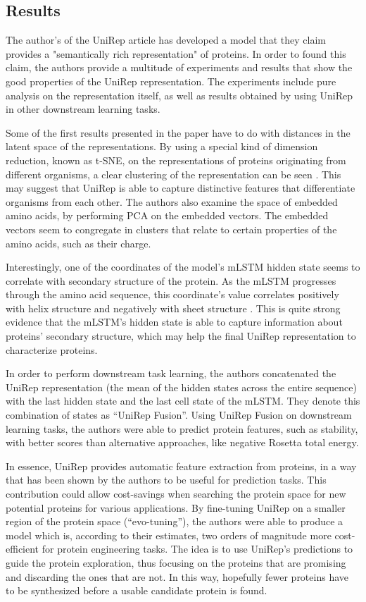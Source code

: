 \documentclass[a4paper,12pt]{article}
\begin{document}
\subsection{Results}

The author's of the UniRep article has developed a model that they claim provides a "semantically rich representation" of proteins. In order to found this claim, the authors provide a multitude of experiments and results that show the good properties of the UniRep representation. The experiments include pure analysis on the representation itself, as well as results obtained by using UniRep in other downstream learning tasks.

Some of the first results presented in the paper have to do with distances in the latent space of the representations. By using a special kind of dimension reduction, known as t-SNE, on the representations of proteins originating from different organisms, a clear clustering of the representation can be seen \cite[fig. 2b]{alley2019unified}. This may suggest that UniRep is able to capture distinctive features that differentiate organisms from each other. The authors also examine the space of embedded amino acids, by performing PCA on the embedded vectors. The embedded vectors seem to congregate in clusters that relate to certain properties of the amino acids, such as their charge.

Interestingly, one of the coordinates of the model's mLSTM hidden state seems to correlate with secondary structure of the protein. As the mLSTM progresses through the amino acid sequence, this coordinate's value correlates positively with helix structure and negatively with sheet structure \cite[fig. 2e]{alley2019unified}. This is quite strong evidence that the mLSTM's hidden state is able to capture information about proteins' secondary structure, which may help the final UniRep representation to characterize proteins.

In order to perform downstream task learning, the authors concatenated the UniRep representation (the mean of the hidden states across the entire sequence) with the last hidden state and the last cell state of the mLSTM. They denote this combination of states as ``UniRep Fusion''. Using UniRep Fusion on downstream learning tasks, the authors were able to predict protein features, such as stability, with better scores than alternative approaches, like negative Rosetta total energy.

In essence, UniRep provides automatic feature extraction from proteins, in a way that has been shown by the authors to be useful for prediction tasks. This contribution could allow cost-savings when searching the protein space for new potential proteins for various applications. By fine-tuning UniRep on a smaller region of the protein space (``evo-tuning''), the authors were able to produce a model which is, according to their estimates, two orders of magnitude more cost-efficient for protein engineering tasks. The idea is to use UniRep's predictions to guide the protein exploration, thus focusing on the proteins that are promising and discarding the ones that are not. In this way, hopefully fewer proteins have to be synthesized before a usable candidate protein is found.
\end{document}
